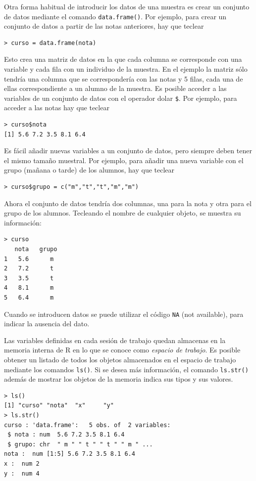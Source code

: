 Otra forma habitual de introducir los datos de una muestra es crear un conjunto de datos mediante el comando
\lstinline{data.frame()}. Por ejemplo, para crear un conjunto de datos a partir de las notas anteriores, hay que teclear
\begin{lstlisting}
> curso = data.frame(nota)
\end{lstlisting}
Esto crea una matriz de datos en la que cada columna se corresponde con una variable y cada fila con un individuo de la
muestra. En el ejemplo la matriz  sólo tendría una columna que se correspondería con las notas y 5
filas, cada una de ellas correspondiente a un alumno de la muestra. Es posible acceder a las variables de un conjunto de
datos con el operador dolar \lstinline{$}. Por ejemplo, para acceder a las notas hay que teclear
\begin{lstlisting}
> curso$nota
[1] 5.6 7.2 3.5 8.1 6.4
\end{lstlisting}
Es fácil añadir nuevas variables a un conjunto de datos, pero siempre deben tener el mismo tamaño muestral. Por ejemplo,
para añadir una nueva variable con el grupo (mañana o tarde) de los alumnos, hay que teclear
\begin{lstlisting}
> curso$grupo = c("m","t","t","m","m")
\end{lstlisting}
Ahora el conjunto de datos  tendría dos columnas, una para la nota y otra para el grupo de los alumnos.
Tecleando el nombre de cualquier objeto, se muestra su información:
\begin{lstlisting}
> curso
   nota   grupo
1   5.6      m
2   7.2      t
3   3.5      t
4   8.1      m
5   6.4      m
\end{lstlisting}

Cuando se introducen datos se puede utilizar el código \lstinline{NA} (not available), para indicar la ausencia del
dato.

Las variables definidas en cada sesión de trabajo quedan almacenas en la memoria interna de R en lo que se conoce como
\emph{espacio de trabajo}.
Es posible obtener un listado de todos los objetos almacenados en el espacio de trabajo mediante los comandos
\lstinline{ls()}.
Si se desea más información, el comando \lstinline{ls.str()} además de mostrar los objetos de la memoria indica sus
tipos y sus valores.
\begin{lstlisting}
> ls()
[1] "curso" "nota"  "x"     "y"    
> ls.str()
curso : 'data.frame':   5 obs. of  2 variables:
 $ nota : num  5.6 7.2 3.5 8.1 6.4
 $ grupo: chr  " m " " t " " t " " m " ...
nota :  num [1:5] 5.6 7.2 3.5 8.1 6.4
x :  num 2
y :  num 4
\end{lstlisting}

